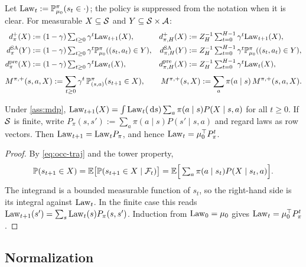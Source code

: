 \begin{definition}\label{def:occ}
Let $\mathrm{Law}_t:=\mathbb{P}^\pi_{\mu_0}(s_t\in\cdot)$; the policy is suppressed from the notation when it is clear.
For measurable $X\subseteq\mathcal{S}$ and $Y\subseteq\mathcal{S}\times\mathcal{A}$:
\begin{align*}
 d^+_\pi(X)&:=(1-\gamma)\textstyle\sum_{t\ge0}\gamma^t\mathrm{Law}_{t+1}(X), &
 d^+_{\pi,H}(X)&:=Z_H^{-1}\textstyle\sum_{t=0}^{H-1}\gamma^t\mathrm{Law}_{t+1}(X),\\
 d^{\mathrm{SA}}_\pi(Y)&:=(1-\gamma)\textstyle\sum_{t\ge0}\gamma^t\mathbb{P}^\pi_{\mu_0}((s_t,a_t)\in Y), &
 d^{\mathrm{SA}}_{\pi,H}(Y)&:=Z_H^{-1}\textstyle\sum_{t=0}^{H-1}\gamma^t\mathbb{P}^\pi_{\mu_0}((s_t,a_t)\in Y),\\
 d^{\mathrm{pre}}_\pi(X)&:=(1-\gamma)\textstyle\sum_{t\ge0}\gamma^t\mathrm{Law}_{t}(X), &
 d^{\mathrm{pre}}_{\pi,H}(X)&:=Z_H^{-1}\textstyle\sum_{t=0}^{H-1}\gamma^t\mathrm{Law}_{t}(X),
\end{align*}
\[
 M^{\pi,+}(s,a,X):=\sum_{t\ge0}\gamma^t\,\mathbb{P}^\pi_{(s,a)}(s_{t+1}\in X),\qquad
 M^{\pi,+}(s,X):=\sum_{a}\pi(a\mid s)\,M^{\pi,+}(s,a,X).
\]
\end{definition}

\begin{lemma}\label{lem:occ-recursion}
Under \cref{ass:mdp}, $\mathrm{Law}_{t+1}(X)=\int\mathrm{Law}_t(\,\mathrm{d} s)\sum_a\pi(a\mid s)P(X\mid s,a)$ for all $t\ge0$.
If $\mathcal{S}$ is finite, write $P_\pi(s,s'):=\sum_a\pi(a\mid s)P(s'\mid s,a)$ and regard laws as row vectors.
Then $\mathrm{Law}_{t+1}=\mathrm{Law}_tP_\pi$, and hence $\mathrm{Law}_t=\mu_0^\top P_\pi^t$.
\end{lemma}
\begin{proof}
By \eqref{eq:occ-traj} and the tower property,
\[
\mathbb{P}(s_{t+1}\in X)=\mathbb{E}\big[\mathbb{P}(s_{t+1}\in X\mid\mathcal{F}_t)\big]
=\mathbb{E}\Big[\textstyle\sum_a\pi(a\mid s_t)P(X\mid s_t,a)\Big].
\]
The integrand is a bounded measurable function of $s_t$, so the right-hand side is its integral against $\mathrm{Law}_t$.
In the finite case this reads $\mathrm{Law}_{t+1}(s')=\sum_s\mathrm{Law}_t(s)P_\pi(s,s')$.
Induction from $\mathrm{Law}_0=\mu_0$ gives $\mathrm{Law}_t=\mu_0^\top P_\pi^t$.
\end{proof}

\subsection{Normalization}\label{sec:occ-norm}

